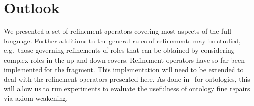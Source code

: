 \documentclass[
]{ceurart}
\begin{document}
%
%
%
%
%
%
%


\section{Outlook}\label{sec:conclusion}


We presented a set of refinement operators covering most aspects of the full \SROIQ language. 
%
Further additions to the general rules of refinements may be studied, e.g.\ those governing refinements of roles that can be obtained by considering complex roles in the up and down covers. 
%
%
Refinement operators have so far been implemented for the \ALC fragment. This implementation will need to be extended to deal with the \SROIQ refinement operators presented here. As done in~\cite{troquard2018repairing} for \ALC ontologies, this will allow us to run experiments to evaluate the usefulness of \SROIQ ontology fine repairs via axiom weakening. %
\end{document}
